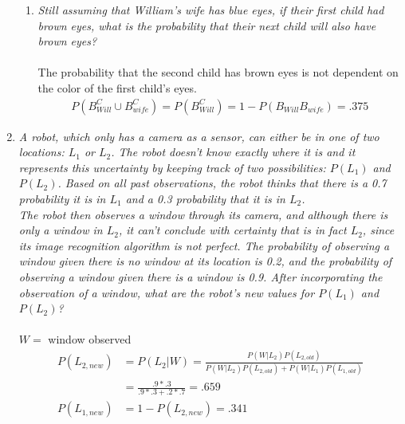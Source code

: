 \documentclass{article} %
\begin{document}
\begin{enumerate}
\begin{enumerate}
	\item \textit{Still assuming that William's wife has blue eyes, if their first child had brown eyes, what is the probability that their next child will also have brown eyes?}\\
	\\
	The probability that the second child has brown eyes is not dependent on the color of the first child's eyes.
	\begin{align*}
	P(B_{Will}^C \cup B_{wife}^C) = P(B_{Will}^C) = 1 - P(B_{Will}B_{wife}) = .375
	\end{align*}
	
	\end{enumerate}	
	
	\item \textit{A robot, which only has a camera as a sensor, can either be in one of two locations: $L_1$ or $L_2$. The robot doesn't know exactly where it is and it represents this uncertainty by keeping track of two possibilities: $P(L_1)$ and $P(L_2)$. Based on all past observations, the robot thinks that there is a 0.7 probability it is in $L_1$ and a 0.3 probability that it is in $L_2$.\\
	The robot then observes a window through its camera, and although there is only a window in $L_2$, it can't conclude with certainty that is in fact $L_2$, since its image recognition algorithm is not perfect. The probability of observing a window given there is no window at its location is 0.2, and the probability of observing a window given there is a window is 0.9. After incorporating the observation of a window, what are the robot's new values for $P(L_1)$ and $P(L_2)$?}\\
	\\
	$W =$ window observed
	\begin{align*}
	P(L_{2,new}) &= P(L_2 | W) = \frac{P(W | L_2)P(L_{2,old})}{P(W | L_2)P(L_{2,old}) + P(W | L_1)P(L_{1,old})}\\
	&= \frac{.9 * .3}{.9 * .3 + .2 * .7} = .659\\
	P(L_{1,new}) &= 1 - P(L_{2,new}) = .341
	\end{align*}
	

\end{enumerate}
\end{document}

